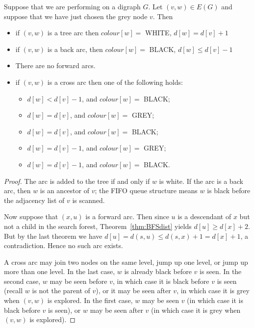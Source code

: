 \begin{Theorem}
\label{thm:BFS-arcclass}
Suppose that we are performing  on a digraph $G$. Let $(v,
w)\in E(G)$ and suppose that we have just chosen the grey node $v$. 
Then
\begin{itemize}
\item
if $(v, w)$ is a tree arc then $colour[w] = $ WHITE, $d[w] = d[v] + 1$
\item
if $(v, w)$ is a back arc, then $colour[w] = $ BLACK, $d[w] \leq d[v] - 1$  
\item
There are no forward arcs.
\item
if $(v, w)$ is a cross arc then one of the following holds:
\begin{itemize}
\item $d[w] < d[v] - 1$, and $colour[w] = $ BLACK;
\item $d[w] = d[v]$, and $colour[w] = $ GREY;
\item $d[w] = d[v]$, and $colour[w] = $ BLACK;
\item $d[w] = d[v] - 1$, and $colour[w] = $ GREY;
\item $d[w] = d[v] - 1$, and $colour[w] = $ BLACK.
\end{itemize}

\end{itemize}

\end{Theorem}

\begin{proof}
The arc is added to the tree if and only if $w$ is white. If the arc is
a back arc, then $w$ is an ancestor of $v$; the FIFO queue structure
means $w$ is black before the adjacency list of $v$ is scanned. 

Now suppose that $(x, u)$ is a forward arc. Then since $u$ is a
descendant of $x$ but not a child in the search forest, Theorem~\ref{thm:BFSdist} yields $d[u]
\geq d[x] + 2$. But by the last theorem we have $d[u] = d(s, u) \leq
d(s, x) + 1 = d[x] + 1$, a contradiction. Hence no such arc exists.

A cross arc may join two nodes on the same level, jump up one level, or
jump up more than one level. In the last case, $w$ is already black before $v$ is seen. In the second case, $w$ may be seen before $v$, in which case it is black before $v$ is seen (recall $w$ is not the parent of $v$), or it may be seen after $v$, in which case it is grey when $(v, w)$ is explored. In the first case, $w$ may be seen  $v$ (in which case it is black before $v$ is seen), or $w$ may be seen after $v$ (in which case it is grey when $(v, w)$ is explored).

\end{proof}

